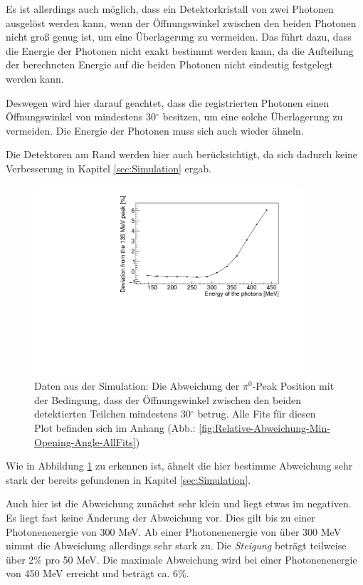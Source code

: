\documentclass[a4paper,11pt,oneside,final,german,openbib,pdftex]{scrbook}
\begin{document}
{Es ist allerdings auch m\"oglich, dass ein Detektorkristall von zwei Photonen ausgel\"ost werden kann, wenn der \"Offnungswinkel zwischen den beiden Photonen nicht gro{\ss} genug ist, um eine \"Uberlagerung zu vermeiden. Das f\"uhrt dazu, dass die Energie der Photonen nicht exakt bestimmt werden kann, da die Aufteilung der berechneten Energie auf die beiden Photonen nicht eindeutig festgelegt werden kann.

Deswegen wird hier darauf geachtet, dass die registrierten Photonen einen \"Offnungswinkel von mindestens 30$^{\circ}$ besitzen, um eine solche \"Uberlagerung zu vermeiden.
Die Energie der Photonen muss sich auch wieder \"ahneln.

Die Detektoren am Rand werden hier auch ber\"ucksichtigt, da sich dadurch keine Verbesserung in Kapitel \ref{sec:Simulation} ergab.

\begin{figure}[h!]
	\begin{center}
		\includegraphics[width=100mm]{20172804MinOpeningAngleDeviation}
		\caption[Simulation: Bweichung für Mindestwinkel zwischen detektierten Photonen]{Daten aus der Simulation: Die Abweichung der $\pi^0$-Peak Position mit der Bedingung, dass der \"Offnungswinkel zwischen den beiden detektierten Teilchen mindestens 30$^{\circ}$ betrug. Alle Fits f\"ur diesen Plot befinden sich im Anhang (Abb.: \ref{fig:Relative-Abweichung-Min-Opening-Angle-AllFits})}
		\label{fig:Relative-Abweichung-Min-Opening-Angle}
	\end{center}
\end{figure}

Wie in Abbildung \ref{fig:Relative-Abweichung-Min-Opening-Angle} zu erkennen ist, \"ahnelt die hier bestimme Abweichung sehr stark der bereits gefundenen in Kapitel \ref{sec:Simulation}.

Auch hier ist die Abweichung zun\"achst sehr klein und liegt etwas im negativen. Es liegt fast keine \"Anderung der Abweichung vor. Dies gilt bis zu einer Photonenenergie von 300 MeV.
Ab einer Photonenenergie von \"uber 300 MeV nimmt die Abweichung allerdings sehr stark zu. Die \textit{Steigung} betr\"agt teilweise \"uber 2\% pro 50 MeV. Die maximale Abweichung wird bei einer Photonenenergie von 450 MeV erreicht und betr\"agt ca. 6\%.

}
\end{document}
